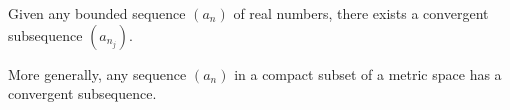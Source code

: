 \documentclass{article}
\begin{document}
Given any bounded sequence $(a_n)$ of real numbers,
there exists a convergent subsequence $(a_{n_j})$.

More generally, any sequence $(a_n)$ in a compact subset of a metric space
has a convergent subsequence.
\end{document}
